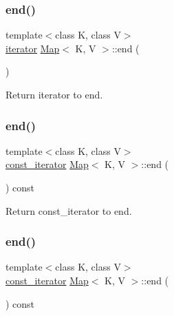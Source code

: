 \subsubsection{\texorpdfstring{end()}{end()}\hspace{0.1cm}{\footnotesize\ttfamily [2/4]}}
{\footnotesize\ttfamily template$<$class K, class V$>$ \\
\hyperlink{classMap_ad1f372a2028b9f46497e873b0e984e84}{iterator} \hyperlink{classMap}{Map}$<$ K, V $>$\+::end (\begin{DoxyParamCaption}{ }\end{DoxyParamCaption})\hspace{0.3cm}{\ttfamily [inline]}}

Return iterator to end. \mbox{\label{classMap_a21f3b20a8a1492065dd775714c5ab8ef}} 
\subsubsection{\texorpdfstring{end()}{end()}\hspace{0.1cm}{\footnotesize\ttfamily [3/4]}}
{\footnotesize\ttfamily template$<$class K, class V$>$ \\
\hyperlink{classMap_add90fe1e25806ba6f6278b264e78ee9a}{const\+\_\+iterator} \hyperlink{classMap}{Map}$<$ K, V $>$\+::end (\begin{DoxyParamCaption}{ }\end{DoxyParamCaption}) const\hspace{0.3cm}{\ttfamily [inline]}}

Return const\+\_\+iterator to end. \mbox{\label{classMap_a21f3b20a8a1492065dd775714c5ab8ef}} 
\subsubsection{\texorpdfstring{end()}{end()}\hspace{0.1cm}{\footnotesize\ttfamily [4/4]}}
{\footnotesize\ttfamily template$<$class K, class V$>$ \\
\hyperlink{classMap_add90fe1e25806ba6f6278b264e78ee9a}{const\+\_\+iterator} \hyperlink{classMap}{Map}$<$ K, V $>$\+::end (\begin{DoxyParamCaption}{ }\end{DoxyParamCaption}) const\hspace{0.3cm}{\ttfamily [inline]}}

